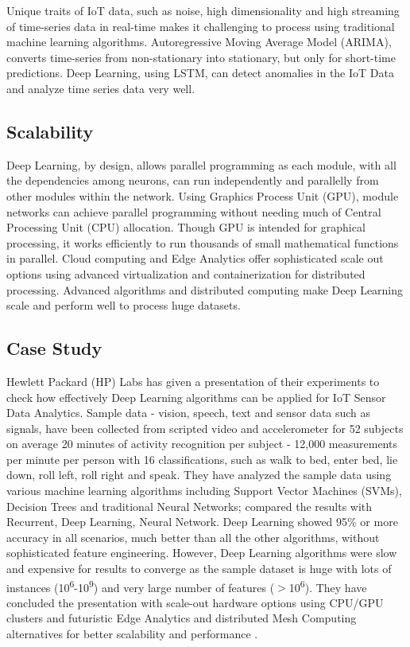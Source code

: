 \documentclass[sigconf]{acmart}
\begin{document}
	Unique traits of IoT data, such as noise, high dimensionality and high streaming of time-series data in real-time makes it challenging to process using traditional machine learning algorithms. Autoregressive Moving Average Model (ARIMA), converts time-series from non-stationary into stationary, but only for short-time predictions. Deep Learning, using LSTM, can detect anomalies in the IoT Data and analyze time series data very well.
	
	\subsection{Scalability}
	
	Deep Learning, by design, allows parallel programming as each module, with all the dependencies among neurons, can run independently and parallelly from other modules within the network. Using Graphics Process Unit (GPU), module networks can achieve parallel programming without needing much of Central Processing Unit (CPU) allocation. Though GPU is intended for graphical processing, it works efficiently to run thousands of small mathematical functions in parallel. Cloud computing and Edge Analytics offer sophisticated scale out options using advanced virtualization and containerization for distributed processing. Advanced algorithms and distributed computing make Deep Learning scale and perform well to process huge datasets. 
	
	\subsection{Case Study}
	
	Hewlett Packard (HP) Labs has given a presentation of their experiments to check how effectively Deep Learning algorithms can be applied for IoT Sensor Data Analytics. Sample data - vision, speech, text and sensor data such as signals, have been collected from scripted video and accelerometer for 52 subjects on average 20 minutes of activity recognition per subject - 12,000 measurements per minute per person with 16 classifications, such as walk to bed, enter bed, lie down, roll left, roll right and speak. They have analyzed the sample data using various machine learning algorithms including Support Vector Machines (SVMs), Decision Trees and traditional Neural Networks; compared the results with Recurrent, Deep Learning, Neural Network. Deep Learning showed 95\% or more accuracy in all scenarios, much better than all the other algorithms, without sophisticated feature engineering. However, Deep Learning algorithms were slow and expensive for results to converge as the sample dataset is huge with lots of instances (10\textsuperscript{6}-10\textsuperscript{9}) and very large number of features ($>$10\textsuperscript{6}). They have concluded the presentation with scale-out hardware options using CPU/GPU clusters and futuristic Edge Analytics and distributed Mesh Computing alternatives for better scalability and performance \cite{hp}. 
			
\end{document}
